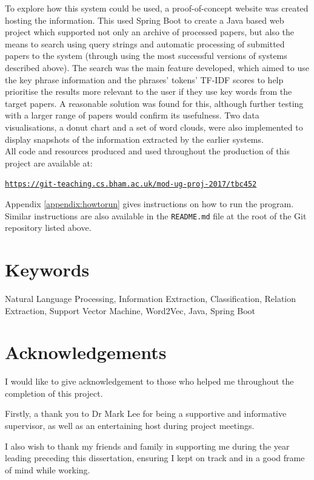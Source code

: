 \documentclass[a4paper]{report}
\begin{document}
To explore how this system could be used, a proof-of-concept website was created hosting the information. This used Spring Boot to create a Java based web project which supported not only an archive of processed papers, but also the means to search using query strings and automatic processing of submitted papers to the system (through using the most successful versions of systems described above). The search was the main feature developed, which aimed to use the key phrase information and the phrases' tokens' TF-IDF scores to help prioritise the results more relevant to the user if they use key words from the target papers. A reasonable solution was found for this, although further testing with a larger range of papers would confirm its usefulness. Two data visualisations, a donut chart and a set of word clouds, were also implemented to display snapshots of the information extracted by the earlier systems. \\

\noindent All code and resources produced and used throughout the production of this project are available at:
\begin{center}
	\texttt{\href{https://git-teaching.cs.bham.ac.uk/mod-ug-proj-2017/tbc452}{https://git-teaching.cs.bham.ac.uk/mod-ug-proj-2017/tbc452}}
\end{center}
\noindent Appendix \ref{appendix:howtorun} gives instructions on how to run the program. Similar instructions are also available in the \texttt{README.md} file at the root of the Git repository listed above.

\section*{Keywords}
Natural Language Processing, Information Extraction, Classification, Relation Extraction, Support Vector Machine, Word2Vec, Java, Spring Boot

\section*{Acknowledgements}
I would like to give acknowledgement to those who helped me throughout the completion of this project.

Firstly, a thank you to Dr Mark Lee for being a supportive and informative supervisor, as well as an entertaining host during project meetings.

I also wish to thank my friends and family in supporting me during the year leading preceding this dissertation, ensuring I kept on track and in a good frame of mind while working.
\end{document}
